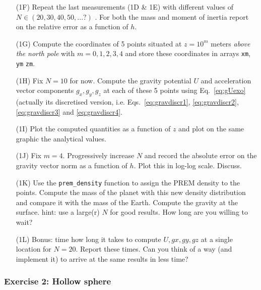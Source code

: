 \begin{itemize}

\item[(1F)] Repeat the last measurements (1D \& 1E) with different values of $N\in(20,30,40,50,...?)$ .
For both the mass and moment of inertia report on the relative error as a function of $h$.

\item[(1G)] Compute the coordinates of 5 points situated at $z=10^m$ meters 
{\it above the north pole} with $m=0,1,2,3,4$ and 
store these coordinates in arrays {\tt xm}, {\tt ym} {\tt zm}. 

\item[(1H)] Fix $N=10$ for now. Compute the gravity potential $U$ and acceleration vector 
components $g_x,g_y,g_z$ at each of these 5 points using Eq.~\eqref{eq:gUexo} (actually its 
discretised version, i.e. Eqs.~\eqref{eq:gravdiscr1}, \eqref{eq:gravdiscr2}, 
\eqref{eq:gravdiscr3} and \eqref{eq:gravdiscr4}.
 
\item[(1I)] Plot the computed quantities as a function of $z$ and plot on 
the same graphic the analytical values. 

\item[(1J)] Fix $m=4$. Progressively increase $N$ and record the absolute error on the gravity vector norm 
as a function of $h$. Plot this in log-log scale. Discuss.

\item[(1K)] Use the {\tt prem\_density} function to assign the PREM \cite{dzan81} density to the points. 
Compute the mass of the planet with this 
new density distribution and compare it with the mass of the Earth. Compute the gravity at the surface.
hint: use a large(r) $N$ for good results. How long are you willing to wait? 

\item[(1L)] Bonus: time how long it takes to compute $U,gx,gy,gz$ at a single location for $N=20$. Report these times. 
Can you think of a way (and implement it) to arrive at the same results in less time?  

\end{itemize}

\subsubsection*{Exercise 2: Hollow sphere}

